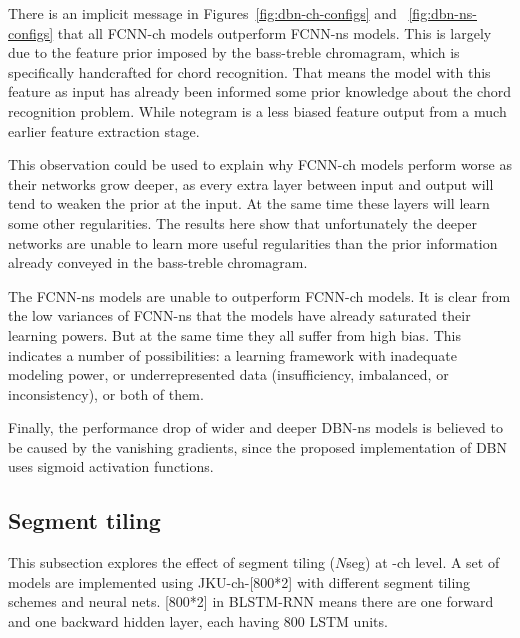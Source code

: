 There is an implicit message in Figures~\ref{fig:dbn-ch-configs} and ~\ref{fig:dbn-ns-configs} that all FCNN-ch models outperform FCNN-ns models. This is largely due to the feature prior imposed by the bass-treble chromagram, which is specifically handcrafted for chord recognition. That means the model with this feature as input has already been informed some prior knowledge about the chord recognition problem. While notegram is a less biased feature output from a much earlier feature extraction stage.

This observation could be used to explain why FCNN-ch models perform worse as their networks grow deeper, as every extra layer between input and output will tend to weaken the prior at the input. At the same time these layers will learn some other regularities. The results here show that unfortunately the deeper networks are unable to learn more useful regularities than the prior information already conveyed in the bass-treble chromagram.

The FCNN-ns models are unable to outperform FCNN-ch models. It is clear from the low variances of FCNN-ns that the models have already saturated their learning powers. But at the same time they all suffer from high bias. This indicates a number of possibilities: a learning framework with inadequate modeling power, or underrepresented data (insufficiency, imbalanced, or inconsistency), or both of them.

Finally, the performance drop of wider and deeper DBN-ns models is believed to be caused by the vanishing gradients, since the proposed implementation of DBN uses sigmoid activation functions.

\subsection{Segment tiling} \label{sec:3-p3}

This subsection explores the effect of segment tiling ($N$seg) at -ch level. A set of models are implemented using JKU-ch-[800*2] with different segment tiling schemes and neural nets. [800*2] in BLSTM-RNN means there are one forward and one backward hidden layer, each having 800 LSTM units.

